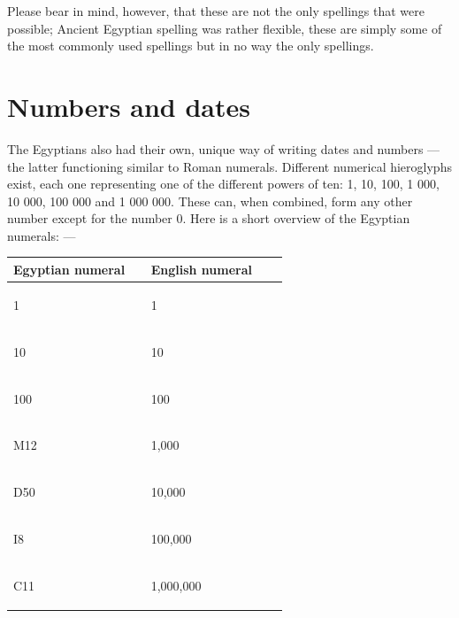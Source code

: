 \documentclass[a5paper,twoside,11pt]{report}
\begin{document}
		Please bear in mind, however, that these are not the only spellings that were possible; Ancient Egyptian spelling was rather flexible, these are simply some of the most commonly used spellings but in no way the only spellings.


  \chapter*{Numbers and dates}

		The Egyptians also had their own, unique way of writing dates and numbers — the latter functioning similar to Roman numerals. Different numerical hieroglyphs exist, each one representing one of the different powers of ten: 1, 10, 100,  1 000, 10 000, 100 000 and 1 000 000. These can, when combined, form any other number except for the number 0. Here is a short overview of the Egyptian numerals: —

    \begin{center}
      \begin{longtable}{p{0.45\linewidth} | p{0.45\linewidth}}
        Egyptian numeral & English numeral \\ [0.5ex]
        \hline\hline
        \begin{hieroglyph}1\end{hieroglyph} & 1 \\
        \hline
        \begin{hieroglyph}10\end{hieroglyph} & 10 \\
        \hline
        \begin{hieroglyph}100\end{hieroglyph} & 100 \\
        \hline
        \begin{hieroglyph}M12\end{hieroglyph} & 1,000 \\
        \hline
        \begin{hieroglyph}D50\end{hieroglyph} & 10,000 \\
        \hline
        \begin{hieroglyph}I8\end{hieroglyph} & 100,000 \\
        \hline
        \begin{hieroglyph}C11\end{hieroglyph} & 1,000,000 \\
        \hline
      \end{longtable}
    \end{center}
\end{document}
